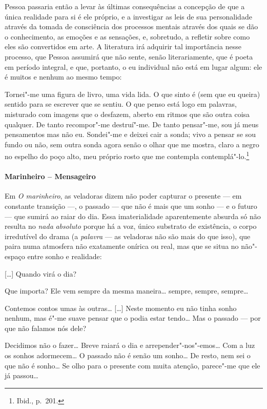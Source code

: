 Pessoa passaria então a levar às últimas consequências a concepção de
que a única realidade para si é ele próprio, e a investigar as leis de
sua personalidade através da tomada de consciência dos processos
mentais através dos quais se dão o conhecimento, as emoções e as
sensações, e, sobretudo, a refletir sobre como eles são convertidos em
arte. A literatura irá adquirir tal importância nesse processo, que
Pessoa assumirá que não sente, senão literariamente, que é poeta em
período integral, e que, portanto, o eu individual não está em lugar
algum: ele é muitos e nenhum ao mesmo tempo: 

\begin{hedraquote}
Tornei"-me uma figura de livro, uma vida lida. O que sinto é (sem que eu
queira) sentido para se escrever que se sentiu. O que penso está logo
em palavras, misturado com imagens que o desfazem, aberto em ritmos que
são outra coisa qualquer. De tanto recompor"-me destruí"-me. De tanto
pensar"-me, sou já meus pensamentos mas não eu. Sondei"-me e deixei cair
a sonda; vivo a pensar se sou fundo ou não, sem outra sonda agora senão
o olhar que me mostra, claro a negro no espelho do poço alto, meu
próprio rosto que me contempla contemplá"-lo.\footnote{ Ibid., p.~201.} 
\end{hedraquote}



\paragraph{Marinheiro -- Mensageiro}

Em \textit{O marinheiro}, as veladoras dizem não poder capturar o
presente --- em constante transição ---,
o passado --- que não é mais que um
sonho --- e o futuro --- que sumirá ao 
raiar do dia. Essa imaterialidade
aparentemente absurda só não resulta 
no \textit{nada} \textit{absoluto}
porque há a voz, único substrato de 
existência, o corpo irredutível do
drama (a \textit{palavra} --- as veladoras 
não são mais do que isso), que
paira numa atmosfera não exatamente onírica 
ou real, mas que se situa
no não"-espaço entre sonho e realidade:

\begin{hedraquote}
 [\ldots{}] Quando virá o dia?

 Que importa? Ele vem sempre
da mesma maneira\ldots{} sempre,
sempre, sempre\ldots{}

\hfill{}

 Contemos contos umas às
outras\ldots{} [\ldots{}] Neste momento eu não
tinha sonho nenhum, mas é"-me suave pensar
que o podia estar tendo\ldots{}
Mas o passado --- por que não falamos nós dele? 

 Decidimos não o fazer\ldots{} Breve raiará o dia e
arrepender"-nos"-emos\ldots{} Com a luz os sonhos adormecem\ldots{}
O passado não é
senão um sonho\ldots{} De resto, nem sei
o que não é sonho\ldots{} Se olho para o
presente com muita atenção, parece"-me que ele já passou\ldots{}
\end{hedraquote}


